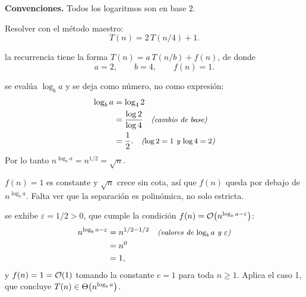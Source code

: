 \documentclass[11pt,letterpaper]{article}
\begin{document}

\noindent\textbf{Convenciones.}
Todos los logaritmos son en base $2$.

\noindent Resolver con el método maestro:
\[
  T(n) = 2\,T(n/4) + 1.
\]

 la recurrencia tiene la forma
$T(n) = a\,T(n/b) + f(n)$, de donde
\[
  a = 2, \qquad b = 4, \qquad f(n) = 1.
\]

 se evalúa $\log_b a$ y se deja como número,
no como expresión:
\begin{align*}
  \log_b a &= \log_4 2 \\
           &= \frac{\log 2}{\log 4} \quad\text{\small\itshape (cambio de base)} \\
           &= \frac{1}{2}. \quad\text{\small\itshape ($\log 2 = 1$ y $\log 4 = 2$)}
\end{align*}
Por lo tanto $n^{\log_b a} = n^{1/2} = \sqrt{n}$.

 $f(n) = 1$ es constante y $\sqrt{n}$ crece sin
cota, así que $f(n)$ queda por debajo de $n^{\log_b a}$. Falta ver que
la separación es polinómica, no solo estricta.

 se exhibe $\varepsilon = 1/2 > 0$, que cumple la
condición $f(n) = \mathcal{O}\!\left(n^{\log_b a - \varepsilon}\right)$:
\begin{align*}
  n^{\log_b a - \varepsilon} &= n^{1/2 - 1/2}
                               \quad\text{\small\itshape (valores de $\log_b a$ y
                                      $\varepsilon$)} \\
                             &= n^{0} \\
                             &= 1,
\end{align*}
y $f(n) = 1 = \mathcal{O}\!\left(1\right)$ tomando la constante $c = 1$ para toda
$n \geq 1$. Aplica el caso 1, que concluye
$T(n) \in \Theta\!\left(n^{\log_b a}\right)$.

\end{document}

